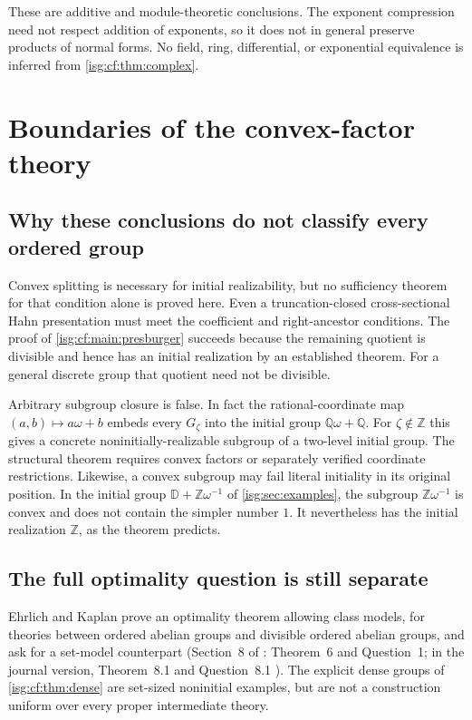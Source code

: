 \documentclass[11pt]{article}
\theoremstyle{definition}
\theoremstyle{remark}
\newcommand{\Z}{\mathbb{Z}}
\newcommand{\D}{\mathbb{D}}
\newcommand{\Q}{\mathbb{Q}}
\begin{document}
These are additive and module-theoretic conclusions. The exponent
compression need not respect addition of exponents, so it does not in
general preserve products of normal forms. No field, ring, differential,
or exponential equivalence is inferred from \cref{isg:cf:thm:complex}.

\section{Boundaries of the convex-factor theory}\label{isg:cf:sec:boundaries}

\subsection{Why these conclusions do not classify every ordered group}
Convex splitting is necessary for initial realizability, but no
sufficiency theorem for that condition alone is proved here. Even a
truncation-closed cross-sectional Hahn presentation must meet the
coefficient and right-ancestor conditions. The proof of
\cref{isg:cf:main:presburger} succeeds because the remaining quotient is
divisible and hence has an initial realization by an established theorem.
For a general discrete group that quotient need not be divisible.

Arbitrary subgroup closure is false. In fact the rational-coordinate
map $(a,b)\mapsto a\omega+b$ embeds every $G_\zeta$ into the initial
group $\Q\omega+\Q$. For $\zeta\notin\Z$ this gives a concrete
noninitially-realizable subgroup of a two-level initial group.
The structural theorem requires convex factors or separately verified
coordinate restrictions.
Likewise, a convex subgroup may fail literal initiality in its original
position. In the initial group $\D+\Z\omega^{-1}$ of
\cref{isg:sec:examples}, the subgroup $\Z\omega^{-1}$ is convex and does
not contain the simpler number $1$. It nevertheless has the initial
realization $\Z$, as the theorem predicts.

\subsection{The full optimality question is still separate}\label{isg:cf:sec:optimality}
Ehrlich and Kaplan prove an optimality theorem allowing class models,
for theories between ordered abelian groups and divisible ordered
abelian groups, and ask for a set-model counterpart (Section~8 of
\cite{EK}: Theorem~6 and Question~1; in the journal version,
Theorem~8.1 and Question~8.1 \cite{EKjournal}). The explicit dense groups
of \cref{isg:cf:thm:dense} are set-sized noninitial examples, but are not
a construction uniform over every proper intermediate theory.
\end{document}
